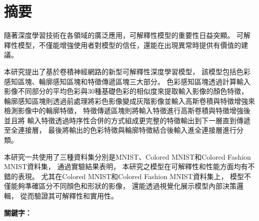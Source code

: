 \documentclass[class=NCU_thesis, crop=false]{standalone}
\begin{document}
\chapter{摘要}

隨著深度學習技術在各領域的廣泛應用，可解釋性模型的重要性日益突顯。
可解釋性模型，不僅能增強使用者對模型的信任，還能在出現異常時提供有價值的建議。

本研究提出了基於卷積神經網路的新型可解釋性深度學習模型，
該模型包括色彩感知區塊、輪廓感知區塊和特徵傳遞區塊三大部分。
色彩感知區塊透過計算輸入影像不同部分的平均色彩與30種基礎色彩的相似度來提取輸入影像的顏色特徵，
輪廓感知區塊則透過前處理將彩色影像變成灰階影像並輸入高斯卷積與特徵增強來檢測影像中的輪廓特徵，
特徵傳遞區塊則將輸入特徵進行高斯卷積與特徵增強後並且將
輸入特徵透過時序性合併的方式組成更完整的特徵輸出到下一層直到傳遞至全連接層，
最後將輸出的色彩特徵與輪廓特徵結合後輸入進全連接層進行分類。

本研究一共使用了三種資料集分別是MNIST、Colored MNIST和Colored Fashion MNIST資料集，
通過實驗結果表明，
本研究之模型在可解釋性和性能方面均有不錯的表現。
尤其在Colored MNIST和Colored Fashion MNIST資料集上，
模型不僅能夠準確區分不同顏色和形狀的影像，
還能透過視覺化展示模型內部決策邏輯，
從而驗證其可解釋性和實用性。

\vspace{2em}
\noindent \textbf{關鍵字：} \keywordsZh{} %
\end{document}
